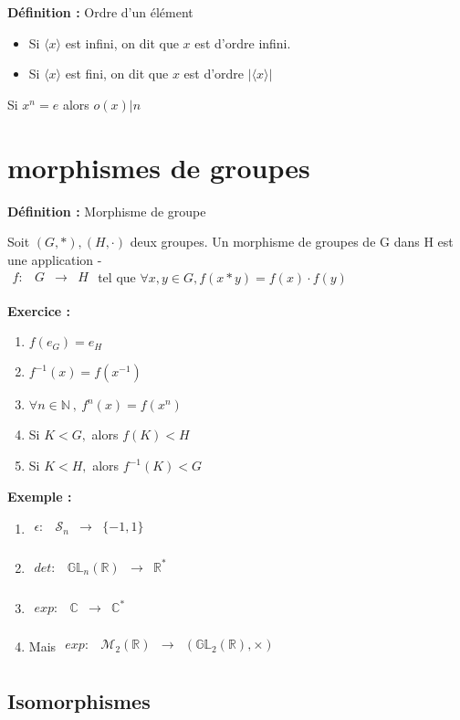 \documentclass{report}
\newenvironment{definition}[1][]{
    \begin{tcolorbox}[colframe= white]
    \textbf{Définition :} 
    #1 \par
    }
    {\end{tcolorbox}}
\newenvironment{exemple}{\begin{tcolorbox}[colback=gray!10,colframe= white]
    \textbf{Exemple :}
     \par}
    {\end{tcolorbox}}
\newenvironment{exo}{\begin{tcolorbox}[colframe= white]
    \textbf{Exercice :}
    \par}
    {\end{tcolorbox}}
\newcommand{\mat}[2]{
    \mathcal{M}_{#1}(\mathbb{#2})
}
\newcommand{\gl}[2]{
    \mathcal{\mathbb{G}\mathbb{L}}_{#1}(\mathbb{#2})
}
\newcommand{\fctsarg}[3]{
    \begin{array}{lrcl}
    #1: & #2 & \longrightarrow & #3 \\
    \end{array}
}
\newcommand{\N}{\mathbb{N}}
\newcommand{\R}{\mathbb{R}}
\newcommand{\C}{\mathbb{C}}
\newcommand{\sn}{\mathcal{S}_{n}}
\begin{document}
\begin{definition}[Ordre d'un élément]
\begin{itemize}[label=$\bullet$]
\item Si $\langle x \rangle$ est infini, on dit que $x$ est d'ordre infini.
\item Si $\langle x \rangle$ est fini, on dit que $x$ est d'ordre $\lvert\langle x \rangle\rvert$
\end{itemize}
Si $x^{n}=e$ alors $o(x)|n$
\end{definition}

\section{morphismes de groupes}
\begin{definition}[Morphisme de groupe]
Soit $(G,\ast), (H,\cdot)$ deux groupes. Un morphisme de groupes de G dans H est une application
{\color{white}-}\\
$\fctsarg{f}{G}{H}$ tel que $\forall x,y \in G, f(x \ast y) = f(x) \cdot f(y)$
\end{definition}

\begin{exo}
\begin{enumerate}
\item $f(e_{G})=e_{H}$
\item $f^{-1}(x)=f(x^{-1})$
\item $\forall n \in \N~,~ f^{n}(x)=f(x^{n})$
\item Si $K < G,$ alors $f(K) < H$
\item Si $K < H,$ alors $f^{-1}(K) < G$
\end{enumerate}
\end{exo}

\begin{exemple}
\begin{enumerate}
    \item $\fctsarg{\epsilon}{\sn}{\{-1,1\}}$ 
    \item $\fctsarg{det}{\gl{n}{\R}}{\R^*}$
    \item $\fctsarg{exp}{\C}{\C^*}$
    \item Mais $\fctsarg{exp}{\mat{2}{R}}{(\gl{2}{\R},\times)}$
\end{enumerate}
\end{exemple}

\subsection{Isomorphismes}
\end{document}

